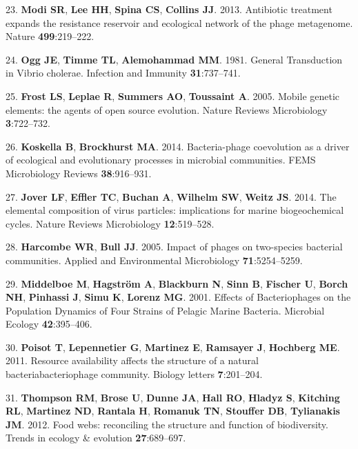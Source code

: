 \documentclass[12pt,]{article}
\begin{document}
\hypertarget{ref-Modi:2013fi}{}
23. \textbf{Modi SR}, \textbf{Lee HH}, \textbf{Spina CS},
\textbf{Collins JJ}. 2013. Antibiotic treatment expands the resistance
reservoir and ecological network of the phage metagenome. Nature
\textbf{499}:219--222.

\hypertarget{ref-Ogg:1981th}{}
24. \textbf{Ogg JE}, \textbf{Timme TL}, \textbf{Alemohammad MM}. 1981.
General Transduction in Vibrio cholerae. Infection and Immunity
\textbf{31}:737--741.

\hypertarget{ref-Frost:2005dn}{}
25. \textbf{Frost LS}, \textbf{Leplae R}, \textbf{Summers AO},
\textbf{Toussaint A}. 2005. Mobile genetic elements: the agents of open
source evolution. Nature Reviews Microbiology \textbf{3}:722--732.

\hypertarget{ref-Koskella:2014ds}{}
26. \textbf{Koskella B}, \textbf{Brockhurst MA}. 2014. Bacteria-phage
coevolution as a driver of ecological and evolutionary processes in
microbial communities. FEMS Microbiology Reviews \textbf{38}:916--931.

\hypertarget{ref-Jover:2014gq}{}
27. \textbf{Jover LF}, \textbf{Effler TC}, \textbf{Buchan A},
\textbf{Wilhelm SW}, \textbf{Weitz JS}. 2014. The elemental composition
of virus particles: implications for marine biogeochemical cycles.
Nature Reviews Microbiology \textbf{12}:519--528.

\hypertarget{ref-Harcombe:2005fd}{}
28. \textbf{Harcombe WR}, \textbf{Bull JJ}. 2005. Impact of phages on
two-species bacterial communities. Applied and Environmental
Microbiology \textbf{71}:5254--5259.

\hypertarget{ref-Middelboe:2001fl}{}
29. \textbf{Middelboe M}, \textbf{Hagström A}, \textbf{Blackburn N},
\textbf{Sinn B}, \textbf{Fischer U}, \textbf{Borch NH}, \textbf{Pinhassi
J}, \textbf{Simu K}, \textbf{Lorenz MG}. 2001. Effects of Bacteriophages
on the Population Dynamics of Four Strains of Pelagic Marine Bacteria.
Microbial Ecology \textbf{42}:395--406.

\hypertarget{ref-Poisot:2011jc}{}
30. \textbf{Poisot T}, \textbf{Lepennetier G}, \textbf{Martinez E},
\textbf{Ramsayer J}, \textbf{Hochberg ME}. 2011. Resource availability
affects the structure of a natural bacteriabacteriophage community.
Biology letters \textbf{7}:201--204.

\hypertarget{ref-Thompson:2012ki}{}
31. \textbf{Thompson RM}, \textbf{Brose U}, \textbf{Dunne JA},
\textbf{Hall RO}, \textbf{Hladyz S}, \textbf{Kitching RL},
\textbf{Martinez ND}, \textbf{Rantala H}, \textbf{Romanuk TN},
\textbf{Stouffer DB}, \textbf{Tylianakis JM}. 2012. Food webs:
reconciling the structure and function of biodiversity. Trends in
ecology \& evolution \textbf{27}:689--697.
\end{document}
